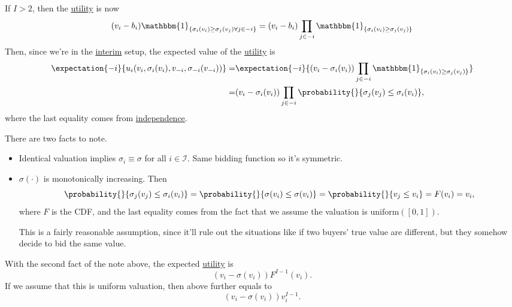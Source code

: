 If \(I>2\), then the \hyperref[def:reward]{utility}  is now
\[
	(v_{i} - b_{i})\mathbbm{1}_{\{ \sigma_{i}(v_{i})\geq \sigma_{j}(v_{j})\forall j\in -i \}} = (v_{i} - b_{i})\prod\limits_{j\in -i} \mathbbm{1}_{\{ \sigma_{i}(v_{i})\geq \sigma_{j}(v_{j}) \}}
\]
Then, since we're in the \hyperref[def:interim]{interim} setup, the expected value of the \hyperref[def:reward]{utility}  is
\[
	\begin{split}
		\expectation{-i}{u_{i}(v_{i}, \sigma_{i}(v_{i}), v_{-i}, \sigma_{-i}(v_{-i}))}
		= &\expectation{-i}{(v_{i} - \sigma_{i}(v_{i})) \prod\limits_{j\in -i}\mathbbm{1}_{\{ \sigma_{i}(v_{i})\geq \sigma_{j}(v_{j}) \}}}\\
		= &(v_{i} - \sigma_{i}(v_{i}))\prod\limits_{j\in -i}\probability{}{\sigma_{j}(v_{j})\leq \sigma_{i}(v_{i})},
	\end{split}
\]
where the last equality comes from \hyperref[def:independent]{independence}.

\begin{note}
	There are two facts to note.
	\begin{itemize}
		\item Identical valuation implies \(\sigma_{i} \equiv \sigma\) for all \(i\in \mathcal{I} \). Same bidding function so it's symmetric.
		\item \(\sigma(\cdot)\) is monotonically increasing. Then
		      \[
			      \probability{}{\sigma_{j}(v_{j})\leq \sigma_{i}(v_{i})} = \probability{}{\sigma(v_{i})\leq \sigma(v_{i})} = \probability{}{v_{j}\leq v_{i}} = F(v_{i}) = v_{i},
		      \]
		      where \(F\) is the CDF, and the last equality comes from the fact that we assume the valuation is \(\mathrm{uniform}([0, 1])\).

		      This is a fairly reasonable assumption, since it'll rule out the situations like if two buyers' true value are different, but they somehow decide to bid
		      the same value.
	\end{itemize}
\end{note}

With the second fact of the note above, the expected \hyperref[def:reward]{utility}  is
\[
	(v_{i} - \sigma(v_{i})) F^{I-1}(v_{i}).
\]
If we assume that this is uniform valuation, then above further equals to
\[
	(v_{i} - \sigma(v_{i}))v^{I-1}_{i}.
\]